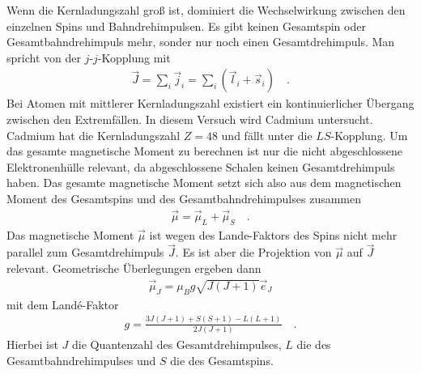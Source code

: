Wenn die Kernladungszahl groß ist, dominiert die Wechselwirkung zwischen den einzelnen Spins und Bahndrehimpulsen. Es gibt keinen Gesamtspin oder Gesamtbahndrehimpuls mehr, sonder nur noch einen Gesamtdrehimpuls. Man spricht von der $j$-$j$-Kopplung mit
\begin{align}
	\vec{J} = \sum_i \vec{j}_i = \sum_i \left( \vec{l}_i + \vec{s}_i \right) \quad .
\end{align}
Bei Atomen mit mittlerer Kernladungszahl existiert ein kontinuierlicher Übergang zwischen den Extremfällen. In diesem Versuch wird Cadmium untersucht. Cadmium hat die Kernladungszahl $Z = 48$ und fällt unter die $LS$-Kopplung. Um das gesamte magnetische Moment zu berechnen ist nur die nicht abgeschlossene Elektronenhülle relevant, da abgeschlossene Schalen keinen Gesamtdrehimpuls haben. Das gesamte magnetische Moment setzt sich also aus dem magnetischen Moment des Gesamtspins und des Gesamtbahndrehimpulses zusammen
\begin{align}
	\vec{\mu} = \vec{\mu}_L + \vec{\mu}_S  \quad .
\end{align}
Das magnetische Moment $\vec{\mu}$ ist wegen des Lande-Faktors des Spins nicht mehr parallel zum Gesamtdrehimpuls $\vec{J}$. Es ist aber die Projektion von $\vec{\mu}$ auf $\vec{J}$ relevant. Geometrische Überlegungen ergeben dann 
\begin{align}
	\vec{\mu}_J = \mu_B g \sqrt{J(J+1)} \vec{e}_J
\end{align}
mit dem Landé-Faktor
\begin{align}
g =	\frac{3J(J+1) + S(S+1) - L(L+1)}{2J(J+1)} \quad .
\end{align}
Hierbei ist $J$ die Quantenzahl des Gesamtdrehimpulses, $L$ die des Gesamtbahndrehimpulses und $S$ die des Gesamtspins.

